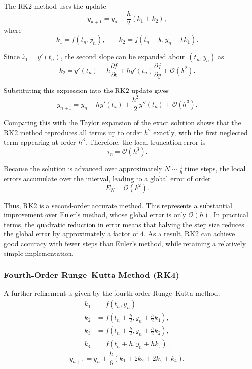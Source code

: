 \documentclass{article}
\begin{document}
The RK2 method uses the update
\begin{equation}
y_{n+1} = y_n + \frac{h}{2}(k_1 + k_2),
\end{equation}
where
\begin{equation}
k_1 = f(t_n, y_n), \qquad k_2 = f(t_n + h, y_n + h k_1).
\end{equation}

Since $k_1 = y'(t_n)$, the second slope can be expanded about $(t_n, y_n)$ as
\begin{equation}
k_2 = y'(t_n) + h \frac{\partial f}{\partial t} + h y'(t_n)\frac{\partial f}{\partial y} + \mathcal{O}(h^2).
\end{equation}

Substituting this expression into the RK2 update gives
\begin{equation}
y_{n+1} = y_n + h y'(t_n) + \frac{h^2}{2} y''(t_n) + \mathcal{O}(h^3).
\end{equation}

Comparing this with the Taylor expansion of the exact solution shows that the RK2 method reproduces all terms up to order $h^2$ exactly, with the first neglected term appearing at order $h^3$. Therefore, the local truncation error is
\begin{equation}
\tau_n = \mathcal{O}(h^3).
\end{equation}

Because the solution is advanced over approximately $N \sim \frac{1}{h}$ time steps, the local errors accumulate over the interval, leading to a global error of order
\begin{equation}
E_N = \mathcal{O}(h^2).
\end{equation}

Thus, RK2 is a second-order accurate method. This represents a substantial improvement over Euler’s method, whose global error is only $\mathcal{O}(h)$. In practical terms, the quadratic reduction in error means that halving the step size reduces the global error by approximately a factor of $4$. As a result, RK2 can achieve good accuracy with fewer steps than Euler’s method, while retaining a relatively simple implementation.

\subsubsection{Fourth-Order Runge--Kutta Method (RK4)}

A further refinement is given by the fourth-order Runge--Kutta method:
\begin{align}
k_1 &= f(t_n, y_n), \\
k_2 &= f\left(t_n + \frac{h}{2}, y_n + \frac{h}{2}k_1\right), \\
k_3 &= f\left(t_n + \frac{h}{2}, y_n + \frac{h}{2}k_2\right), \\
k_4 &= f(t_n + h, y_n + h k_3),
\end{align}
\begin{equation}
y_{n+1} = y_n + \frac{h}{6}(k_1 + 2k_2 + 2k_3 + k_4).
\end{equation}
\end{document}
